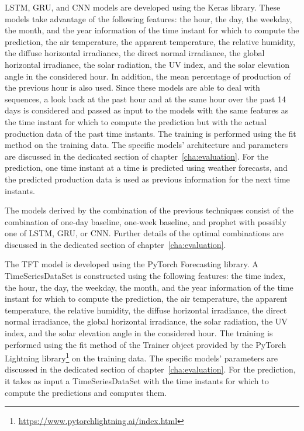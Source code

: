 LSTM, GRU, and CNN models are developed using the Keras library.
These models take advantage of the following features: the hour, the day, the weekday, the month, and the year information of the time instant for which to compute the prediction, the air temperature, the apparent temperature, the relative humidity, the diffuse horizontal irradiance, the direct normal irradiance, the global horizontal irradiance, the solar radiation, the UV index, and the solar elevation angle in the considered hour.
In addition, the mean percentage of production of the previous hour is also used.
Since these models are able to deal with sequences, a look back at the past hour and at the same hour over the past 14 days is considered and passed as input to the models with the same features as the time instant for which to compute the prediction but with the actual production data of the past time instants.
The training is performed using the fit method on the training data.
The specific models’ architecture and parameters are discussed in the dedicated section of chapter~\ref{cha:evaluation}.
For the prediction, one time instant at a time is predicted using weather forecasts, and the predicted production data is used as previous information for the next time instants.

The models derived by the combination of the previous techniques consist of the combination of one-day baseline, one-week baseline, and prophet with possibly one of LSTM, GRU, or CNN.
Further details of the optimal combinations are discussed in the dedicated section of chapter~\ref{cha:evaluation}.

The TFT model is developed using the PyTorch Forecasting library.
A TimeSeriesDataSet is constructed using the following features: the time index, the hour, the day, the weekday, the month, and the year information of the time instant for which to compute the prediction, the air temperature, the apparent temperature, the relative humidity, the diffuse horizontal irradiance, the direct normal irradiance, the global horizontal irradiance, the solar radiation, the UV index, and the solar elevation angle in the considered hour.
The training is performed using the fit method of the Trainer object provided by the PyTorch Lightning library\footnote{ \url{https://www.pytorchlightning.ai/index.html} } on the training data.
The specific models’ parameters are discussed in the dedicated section of chapter~\ref{cha:evaluation}.
For the prediction, it takes as input a TimeSeriesDataSet with the time instants for which to compute the predictions and computes them.


